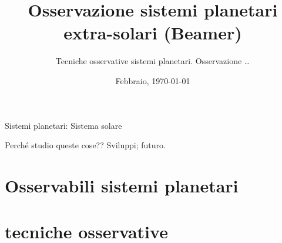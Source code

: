 \documentclass[10pt,xcolor={usenames},fleqn,mathserif,serif]{beamer}
\title{Osservazione sistemi planetari extra-solari (Beamer)}
\subtitle{Tecniche osservative sistemi planetari. Osservazione \ldots}
\date{Febbraio, \today}
\begin{document}



\begin{frame}
  \titlepage
\end{frame}


\begin{frame}[label={argomenti}]{Sistemi planetari: Sistema solare}

\tableofcontents[onlyparts]


\end{frame}

\begin{wordonframe}{Perch\'e studio queste cose?? Sviluppi; futuro.}


\end{wordonframe}

\part{Osservabili sistemi planetari}\label{part:observables}
\frame{\partpage}



\part{tecniche osservative}\label{part:tech}
\frame{\partpage}


\end{document}
